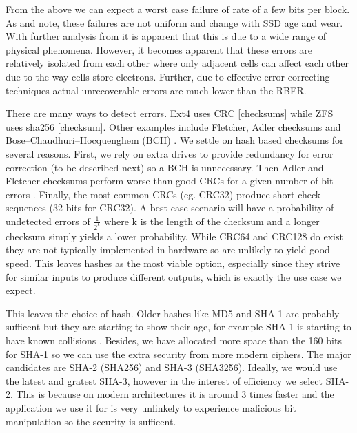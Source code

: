 
        From the above we can expect a worst case failure of rate of a few bits
        per block. As \citeauthor{flash_reliability} and
        \citeauthor{flash_large_scale} note, these failures are not uniform and
        change with SSD age and wear. With further analysis from
        \citeauthor{flash_error_manual} it is apparent that this is due to a
        wide range of physical phenomena. However, it becomes apparent that
        these errors are relatively isolated from each other where only
        adjacent cells can affect each other due to the way cells store
        electrons. Further, due to effective error correcting techniques actual
        unrecoverable errors are much lower than the RBER.

        There are many ways to detect errors. Ext4 uses CRC \cite{ext4_docs}[checksums]
        while ZFS uses sha256 \cite{ZFS_docs}[checksum]. Other examples include
        Fletcher, Adler checksums \cite{embedded_checksums} and
        Bose–Chaudhuri–Hocquenghem (BCH) \cite{flash_error_manual}. We settle
        on hash based checksums for several reasons. First, we rely on extra
        drives to provide redundancy for error correction (to be described
        next) so a BCH is unnecessary. Then Adler and Fletcher checksums
        perform worse than good CRCs for a given number of bit errors
        \citeauthor{embedded_checksums}. Finally, the most common CRCs (eg.
        CRC32) produce short check sequences (32 bits for CRC32). A best case
        scenario will have a probability of undetected errors of
        $\frac{1}{2^k}$
        where k is the length of the checksum \cite{embedded_checksums} and a
        longer checksum simply yields a lower probability. While CRC64 and
        CRC128 do exist they are not typically implemented in hardware so are
        unlikely to yield good speed. This leaves hashes as the most viable
        option, especially since they strive for similar inputs to produce
        different outputs, which is exactly the use case we expect.

        This leaves the choice of hash. Older hashes like MD5 and SHA-1 are
        probably sufficent but they are starting to show their age, for example
        SHA-1 is starting to have known collisions \cite{SHA_collision}.
        Besides, we have allocated more space than the 160 bits for SHA-1 so we
        can use the extra security from more modern ciphers. The major
        candidates are SHA-2 (SHA256) and SHA-3 (SHA3256). Ideally, we would
        use the latest and gratest SHA-3, however in the interest of efficiency
        we select SHA-2. This is because on modern architectures it is around 3
        times faster \cite{hash_stats} and the application we use it for is
        very unlinkely to experience malicious bit manipulation so the security
        is sufficent.

